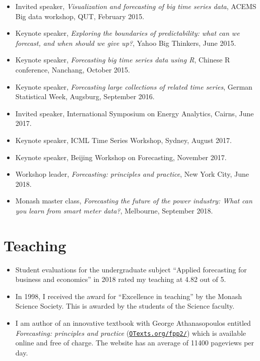 \documentclass[10pt,a4paper,]{article}
\providecommand{\tightlist}{%
  \setlength{\itemsep}{0pt}\setlength{\parskip}{0pt}}
\begin{document}
\begin{itemize}
\item
  Invited speaker, \emph{Visualization and forecasting of big time
  series data}, ACEMS Big data workshop, QUT, February 2015.
\item
  Keynote speaker, \emph{Exploring the boundaries of predictability:
  what can we forecast, and when should we give up?}, Yahoo Big
  Thinkers, June 2015.
\item
  Keynote speaker, \emph{Forecasting big time series data using R},
  Chinese R conference, Nanchang, October 2015.
\item
  Keynote speaker, \emph{Forecasting large collections of related time
  series}, German Statistical Week, Augsburg, September 2016.
\item
  Invited speaker, International Symposium on Energy Analytics, Cairns,
  June 2017.
\item
  Keynote speaker, ICML Time Series Workshop, Sydney, August 2017.
\item
  Keynote speaker, Beijing Workshop on Forecasting, November 2017.
\item
  Workshop leader, \emph{Forecasting: principles and practice}, New York
  City, June 2018.
\item
  Monash master class, \emph{Forecasting the future of the power
  industry: What can you learn from smart meter data?}, Melbourne,
  September 2018.
\end{itemize}

\hypertarget{teaching}{%
\section{Teaching}\label{teaching}}

\begin{itemize}
\tightlist
\item
  Student evaluations for the undergraduate subject \enquote{Applied
  forecasting for business and economics} in 2018 rated my teaching at
  4.82 out of 5.
\item
  In 1998, I received the award for \enquote{Excellence in teaching} by
  the Monash Science Society. This is awarded by the students of the
  Science faculty.
\item
  I am author of an innovative textbook with George Athanasopoulos
  entitled \emph{Forecasting: principles and practice}
  (\href{https://OTexts.org/fpp2}{\texttt{OTexts.org/fpp2/}}) which is
  available online and free of charge. The website has an average of
  11400 pageviews per day.
\end{itemize}
\end{document}
